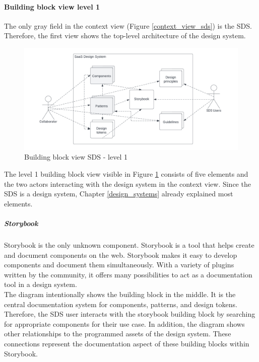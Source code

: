 \paragraph{Building block view level 1}
The only gray field in the context view (Figure \ref{context_view_sds}) is the \acl{SDS}. Therefore, the first view shows the top-level architecture of the design system. \\
\begin{figure}[htbp]
    \centerline{
    \includegraphics[width=\linewidth]{images/building_block_view_level_1.png}}
\caption{Building block view \ac{SDS} - level 1}
\label{building_block_level_1_sds}
\end{figure}
The level 1 building block view visible in Figure \ref{building_block_level_1_sds} consists of five elements and the two actors interacting with the design system in the context view. Since the SDS is a design system, Chapter \ref{design_systems} already explained most elements.\\

\subparagraph{Storybook}
Storybook is the only unknown component. Storybook is a tool that helps create and document components on the web. Storybook makes it easy to develop components and document them simultaneously. With a variety of plugins written by the community, it offers many possibilities to act as a documentation tool in a design system. \cite{storybook_storybook_nodate}\\
The diagram intentionally shows the building block in the middle. It is the central documentation system for components, patterns, and design tokens. Therefore, the SDS user interacts with the storybook building block by searching for appropriate components for their use case. In addition, the diagram shows other relationships to the programmed assets of the design system. These connections represent the documentation aspect of these building blocks within Storybook.\\

